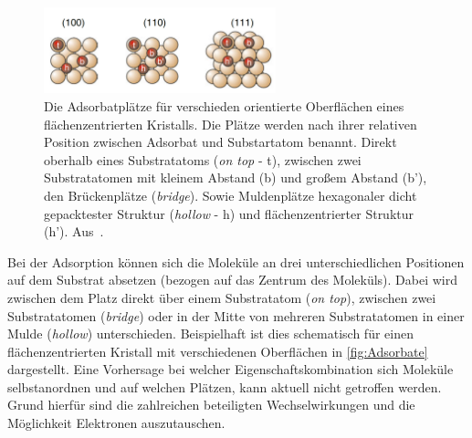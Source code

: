             \begin{figure}
                \centering
                \includegraphics[width=0.6\textwidth]{Adsorbate}
                \caption{Die Adsorbatplätze für verschieden orientierte Oberflächen eines flächenzentrierten Kristalls.
                Die Plätze werden nach ihrer relativen Position zwischen Adsorbat und Substartatom benannt.
                Direkt oberhalb eines Substratatoms (\textit{on top} - t), zwischen zwei Substratatomen mit kleinem Abstand (b) und großem Abstand (b'), den Brückenplätze (\textit{bridge}).
                Sowie Muldenplätze hexagonaler dicht gepacktester Struktur (\textit{hollow} - h) und flächenzentrierter Struktur (h'). Aus~\cite{Fauster}.}
                \label{fig:Adsorbate}
            \end{figure}
            Bei der Adsorption können sich die Moleküle an drei unterschiedlichen Positionen auf dem Substrat absetzen (bezogen auf das Zentrum des Moleküls).
            Dabei wird zwischen dem Platz direkt über einem Substratatom (\textit{on top}), zwischen zwei Substratatomen (\textit{bridge}) oder in der Mitte von mehreren Substratatomen in einer Mulde (\textit{hollow}) unterschieden.
            Beispielhaft ist dies schematisch für einen flächenzentrierten Kristall mit verschiedenen Oberflächen in \autoref{fig:Adsorbate} dargestellt.
            Eine Vorhersage bei welcher Eigenschaftskombination sich Moleküle selbstanordnen und auf welchen Plätzen, kann aktuell nicht getroffen werden.
            Grund hierfür sind die zahlreichen beteiligten Wechselwirkungen und die Möglichkeit Elektronen auszutauschen. 

